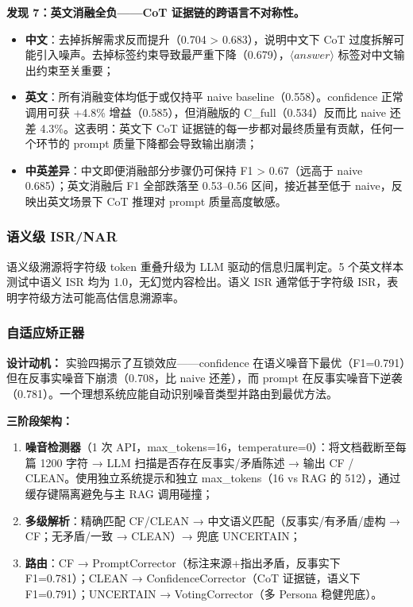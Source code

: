 \documentclass[UTF8,zihao=-4]{ctexart}
\begin{document}
\textbf{发现 7：英文消融全负——CoT 证据链的跨语言不对称性。}
\begin{itemize}
  \item \textbf{中文}：去掉拆解需求反而提升（0.704 > 0.683），说明中文下 CoT 过度拆解可能引入噪声。去掉标签约束导致最严重下降（0.679），$\langle answer\rangle$ 标签对中文输出约束至关重要；
  \item \textbf{英文}：所有消融变体均低于或仅持平 naive baseline（0.558）。confidence 正常调用可获 +4.8\% 增益（0.585），但消融版的 C\_full（0.534）反而比 naive 还差 4.3\%。这表明：英文下 CoT 证据链的每一步都对最终质量有贡献，任何一个环节的 prompt 质量下降都会导致输出崩溃；
  \item \textbf{中英差异}：中文即便消融部分步骤仍可保持 F1 > 0.67（远高于 naive 0.685）；英文消融后 F1 全部跌落至 0.53--0.56 区间，接近甚至低于 naive，反映出英文场景下 CoT 推理对 prompt 质量高度敏感。
\end{itemize}

\subsubsection{语义级 ISR/NAR}

语义级溯源将字符级 token 重叠升级为 LLM 驱动的信息归属判定。5 个英文样本测试中语义 ISR 均为 1.0，无幻觉内容检出。语义 ISR 通常低于字符级 ISR，表明字符级方法可能高估信息溯源率。

\subsubsection{自适应矫正器}

\textbf{设计动机：} 实验四揭示了互锁效应——confidence 在语义噪音下最优（F1=0.791）但在反事实噪音下崩溃（0.708，比 naive 还差），而 prompt 在反事实噪音下逆袭（0.781）。一个理想系统应能自动识别噪音类型并路由到最优方法。

\textbf{三阶段架构：}

\begin{enumerate}[leftmargin=2.5em, itemsep=0.3em]
  \item \textbf{噪音检测器}（1 次 API，max\_tokens=16，temperature=0）：将文档截断至每篇 1200 字符 → LLM 扫描是否存在反事实/矛盾陈述 → 输出 CF / CLEAN。使用独立系统提示和独立 max\_tokens（16 vs RAG 的 512），通过缓存键隔离避免与主 RAG 调用碰撞；
  \item \textbf{多级解析}：精确匹配 CF/CLEAN → 中文语义匹配（反事实/有矛盾/虚构 → CF；无矛盾/一致 → CLEAN）→ 兜底 UNCERTAIN；
  \item \textbf{路由}：CF → PromptCorrector（标注来源+指出矛盾，反事实下 F1=0.781）；CLEAN → ConfidenceCorrector（CoT 证据链，语义下 F1=0.791）；UNCERTAIN → VotingCorrector（多 Persona 稳健兜底）。
\end{enumerate}
\end{document}
